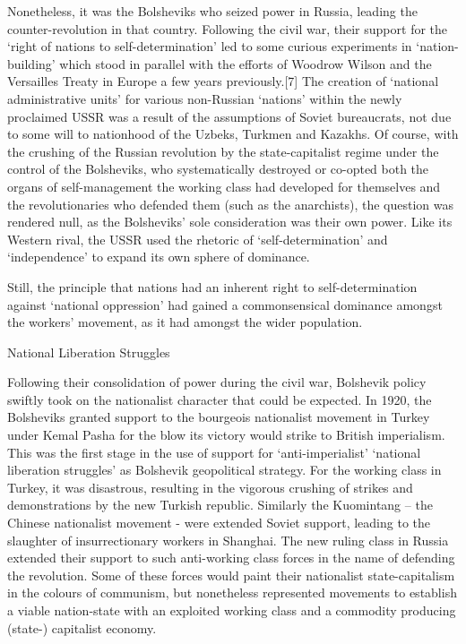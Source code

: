 Nonetheless, it was the Bolsheviks who seized power in Russia, leading the counter-revolution in that country.
Following the civil war, their support for the ‘right of nations to self-determination’ led to some curious experiments in ‘nation-building’ which stood in parallel with the efforts of Woodrow Wilson and the Versailles Treaty in Europe a few years previously.[7] The creation of ‘national administrative units’ for various non-Russian ‘nations’ within the newly proclaimed USSR was a result of the assumptions of Soviet bureaucrats, not due to some will to nationhood of the Uzbeks, Turkmen and Kazakhs.
Of course, with the crushing of the Russian revolution by the state-capitalist regime under the control of the Bolsheviks, who systematically destroyed or co-opted both the organs of self-management the working class had developed for themselves and the revolutionaries who defended them (such as the anarchists), the question was rendered null, as the Bolsheviks’ sole consideration was their own power.
Like its Western rival, the USSR used the rhetoric of ‘self-determination’ and ‘independence’ to expand its own sphere of dominance.

Still, the principle that nations had an inherent right to self-determination against ‘national oppression’ had gained a commonsensical dominance amongst the workers’ movement, as it had amongst the wider population.

National Liberation Struggles

Following their consolidation of power during the civil war, Bolshevik policy swiftly took on the nationalist character that could be expected.
In 1920, the Bolsheviks granted support to the bourgeois nationalist movement in Turkey under Kemal Pasha for the blow its victory would strike to British imperialism.
This was the first stage in the use of support for ‘anti-imperialist’ ‘national liberation struggles’ as Bolshevik geopolitical strategy.
For the working class in Turkey, it was disastrous, resulting in the vigorous crushing of strikes and demonstrations by the new Turkish republic.
Similarly the Kuomintang – the Chinese nationalist movement - were extended Soviet support, leading to the slaughter of insurrectionary workers in Shanghai.
The new ruling class in Russia extended their support to such anti-working class forces in the name of defending the revolution.
Some of these forces would paint their nationalist state-capitalism in the colours of communism, but nonetheless represented movements to establish a viable nation-state with an exploited working class and a commodity producing (state-) capitalist economy.

